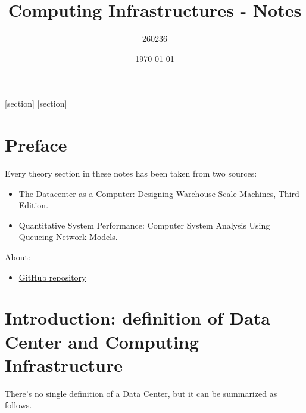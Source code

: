 \documentclass[a4paper]{article}
\begin{document}
    [section]
    [section]
    
    

    \author{260236}
	\title{Computing Infrastructures - Notes}
	\date{\printdayoff\today}
	\maketitle

	\newpage

    \section*{Preface}

    Every theory section in these notes has been taken from two sources:
    \begin{itemize}
        \item The Datacenter as a Computer: Designing Warehouse-Scale Machines, Third Edition.\cite{barroso2022datacenter}

        \item Quantitative System Performance: Computer System Analysis Using Queueing Network Models.\cite{lazowska1984quantitative}
    \end{itemize}
    About:
    \begin{itemize}
        \item[\faIcon{github}] \href{https://github.com/PoliMI-HPC-E-notes-projects-AndreVale69/HPC-E-PoliMI-university-notes}{GitHub repository}
    \end{itemize}
    
    \newpage
	
	\tableofcontents

    \newpage

    \section{Introduction: definition of Data Center and Computing Infrastructure}

    There's no single definition of a Data Center, but it can be summarized as follows.
    
\end{document}
